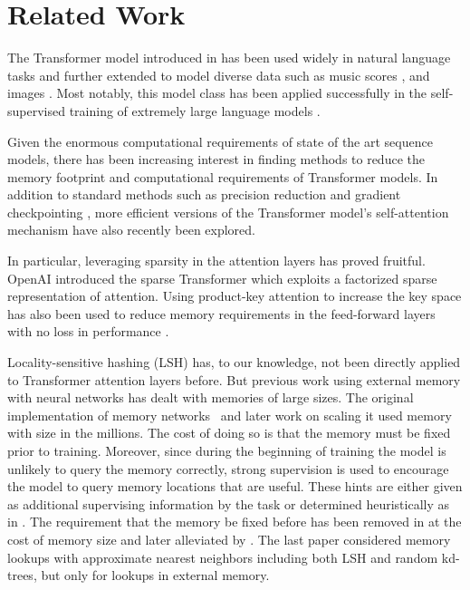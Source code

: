 \documentclass{article} \usepackage{iclr2020_conference,times}
\begin{document}
\section{Related Work} \label{sec:relwork}

The Transformer model introduced in \citep{transformer} has been used
widely in natural language tasks and further extended to model diverse data such as music scores \citep{huang2018music}, 
and images \citep{parmar2018imagetransformer, ramachandran2019attentionimage}.  Most notably, this model class 
has been applied successfully in the self-supervised training of extremely large language models
\citep{devlin2018BERT, radford2019GPT2}.

Given the enormous computational requirements of state of the art sequence models, 
there has been increasing interest in finding methods to reduce the memory footprint and computational 
requirements of Transformer models.  In addition to standard methods such as precision reduction and gradient checkpointing \citep{sohoni2019lowmemory}, more efficient versions of the Transformer model's self-attention mechanism \citep{sukhbaatar2019adaptiveattn, sukhbaatar2019persistentmemory} have also recently been explored.

In particular, leveraging sparsity in the attention layers has proved fruitful. OpenAI introduced
the sparse Transformer \citep{child2019sparsetransformer} which exploits a factorized sparse 
representation of attention.  Using product-key attention to increase the key space has also been used to reduce memory requirements in the feed-forward layers with no loss in performance 
\citep{lample2019productkeys}.

Locality-sensitive hashing (LSH) has, to our knowledge, not been directly applied to 
Transformer attention layers before. But previous work using external memory with neural networks has
dealt with memories of large sizes.  The original implementation of memory networks~\citep{mem_nets} and later work on scaling it \citep{large_mem_nets, hier_mem_nets} used memory with size in the millions.  The cost of doing so is that the memory must be fixed prior to training. Moreover, since during the beginning of training the model is unlikely to query the memory correctly, strong supervision is used to encourage the model to query memory locations that are useful. These hints are either given as additional supervising information by the  task or determined heuristically as in \citet{goldilocks}.
The requirement that the memory be fixed before has been removed in
\citet{santoro16} at the cost of memory size and later alleviated by \citet{jack_rae}. The last paper considered memory lookups with approximate nearest neighbors including both LSH and random kd-trees, but only for lookups in external memory.
\end{document}
